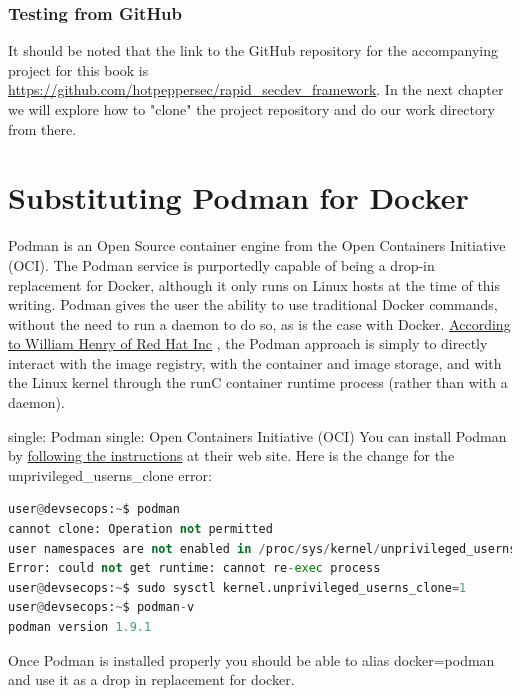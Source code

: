 \subsubsection{Testing from GitHub}
\justify
It should be noted that the link to the GitHub repository for the accompanying project for this book is
\url{https://github.com/hotpeppersec/rapid_secdev_framework}. In the next chapter we will explore how to "clone" the project repository and do our work directory from there.

\section{Substituting Podman for Docker}
\justify
Podman is an Open Source container engine from the Open Containers Initiative (OCI). The Podman service is purportedly capable of being a drop-in replacement for Docker, although it only runs on Linux hosts at the time of this writing. Podman gives the user the ability to use traditional Docker commands, without the need to run a daemon to do so,
as is the case with Docker.
\href{https://developers.redhat.com/blog/2019/02/21/podman-and-buildah-for-docker-users/}{According to William Henry of Red Hat Inc} , the Podman approach is simply to directly interact with the image registry, with the container and image storage, and with the Linux kernel through the runC container runtime process (rather than with a daemon).

single: Podman single: Open Containers Initiative (OCI)
\justify
You can install Podman by \href{https://podman.io/getting-started/installation.html}{following the instructions} at their web site.
\justify
Here is the change for the unprivileged\_userns\_clone error:

\begin{lstlisting}[language=Python]
user@devsecops:~$ podman
cannot clone: Operation not permitted
user namespaces are not enabled in /proc/sys/kernel/unprivileged_userns_clone
Error: could not get runtime: cannot re-exec process
user@devsecops:~$ sudo sysctl kernel.unprivileged_userns_clone=1
user@devsecops:~$ podman-v
podman version 1.9.1
\end{lstlisting}
\justify
Once Podman is installed properly you should be able to
alias docker=podman and use it as a drop in replacement for docker.

